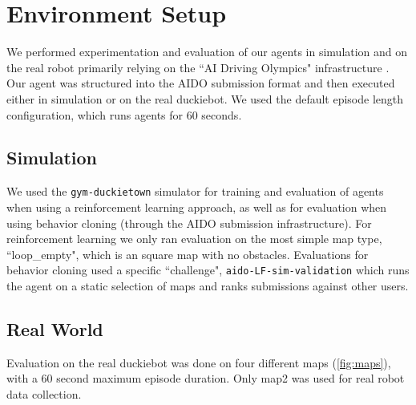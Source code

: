 \documentclass{article}
\begin{document}
\section{Environment Setup}

We performed experimentation and evaluation of our agents in simulation and on the real robot primarily relying on the ``AI Driving Olympics" infrastructure \cite{zilly2019ai}. Our agent was structured into the AIDO submission format and then executed either in simulation or on the real duckiebot. We used the default episode length configuration, which runs agents for 60 seconds.

\subsection{Simulation}

We used the \texttt{gym-duckietown} simulator \cite{gym_duckietown} for training and evaluation of agents when using a reinforcement learning approach, as well as for evaluation when using behavior cloning (through the AIDO submission infrastructure). For reinforcement learning we only ran evaluation on the most simple map type, ``loop\_empty", which is an square map with no obstacles. Evaluations for behavior cloning used a specific ``challenge", \texttt{aido-LF-sim-validation} which runs the agent on a static selection of maps and ranks submissions against other users.

\subsection{Real World}

Evaluation on the real duckiebot was done on four different maps (\ref{fig:maps}), with a 60 second maximum episode duration. Only map2 was used for real robot data collection.
\end{document}
